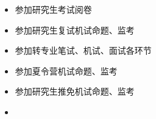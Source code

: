 
\begin{frame}{}
  \begin{columns}
      \begin{itemize}
        \setlength{\itemsep}{10pt}
        \item 参加研究生考试阅卷
        \item 参加研究生复试机试命题、监考
        \item 参加转专业笔试、机试、面试各环节
        \item 参加夏令营机试命题、监考
        \item 参加研究生推免机试命题、监考
        \item {}
      \end{itemize}
  \end{columns}

  \vspace{0.50cm}
  \begin{center}
  \end{center}
\end{frame}
